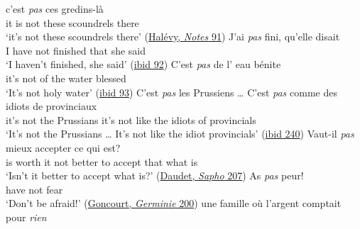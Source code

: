 \ea \label{ex:03-09}
\ea
\gll c'est \textit{pas} ces gredins-là\\
 {it is} not these {scoundrels there}\\
\glt `it's not these scoundrels there'
\hfill(\href{https://archive.org/details/notesetsouvenir01halgoog/page/n105/mode/2up?q=%22c%27est+pas+ces+gredins-la%22&view=theater}{Halévy, \textit{Notes} 91}) %
\ex
\gll J'ai \textit{pas} fini, qu'elle disait\\
 {I have} not finished {that she} said\\
\glt `I haven't finished, she said'
\hfill(\href{https://archive.org/details/notesetsouvenir01halgoog/page/n107/mode/2up?q=%22J%27ai+pas+fini%2C+qu%27elle+disait%22&view=theater}{ibid 92})
\ex
\gll C'est \textit{pas} de l' eau bénite\\
 it's not of the water blessed\\
\glt `It's not holy water'
\hfill(\href{https://archive.org/details/notesetsouvenir01halgoog/page/n107/mode/2up?q=%22C%27est+pas+de+l%27eau+b%C3%A9nite%22&view=theater}{ibid 93}) %
\ex
\gll C'est \textit{pas} les Prussiens {\dots} C'est \textit{pas} comme des idiots de provinciaux\\
 it's not the Prussians {} it's not like the idiots of provincials\\
\glt `It's not the Prussians {\dots} It's not like the idiot provincials'
\hfill(\href{https://archive.org/details/notesetsouvenir01halgoog/page/n255/mode/2up?q=%22C%27est+pas+les+Prussiens%22&view=theater}{ibid 240}) %
\ex
\gll Vaut-il \textit{pas} mieux accepter ce qui est?\\
 {is worth it} not better {to accept} that what is\\
\glt `Isn't it better to accept what is?'
\hfill(\href{https://archive.org/details/saphomoeursparis00dauduoft/page/232/mode/2up?q=%22Vaut-il+pas+mieux+accepter+ce+qui+est+%22&view=theater}{Daudet, \textit{Sapho} 207})
\ex
\gll As \textit{pas} peur!\\
 have not fear\\
\glt `Don't be afraid!'
\hfill(\href{https://archive.org/details/germinielacerte00gonc/page/200/mode/2up?q=%22as+pas+peur%22&view=theater}{Goncourt, \textit{Germinie} 200})
\ex
{}\gll une famille où l'argent comptait pour \textit{rien}\\
